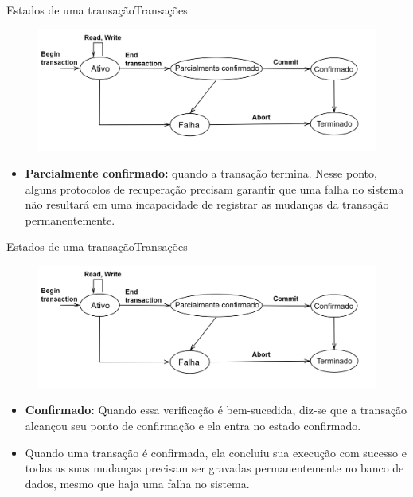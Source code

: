 \documentclass[t]{beamer}
\begin{document}
\begin{ftst}{Estados de uma transação}{Transações}
    \begin{figure}
        \centering
        \includegraphics[scale=0.15]{Figuras_transacoes/6.png}
    \end{figure}
    \small
    \begin{itemize}
        \item \textbf{Parcialmente confirmado:} quando a transação termina. Nesse ponto, alguns protocolos de recuperação precisam garantir que uma falha no sistema não resultará em uma incapacidade de registrar as mudanças da transação permanentemente.
    \end{itemize}
    
\end{ftst}


\begin{ftst}{Estados de uma transação}{Transações}
    \begin{figure}
        \centering
        \includegraphics[scale=0.12]{Figuras_transacoes/6.png}
    \end{figure}
    \small
    \begin{itemize}
        \item \textbf{Confirmado:} Quando essa verificação é bem-sucedida, diz-se que a transação alcançou seu ponto de confirmação e ela entra no estado confirmado. 
        \item Quando uma transação é confirmada, ela concluiu sua execução com sucesso e todas as suas mudanças precisam ser gravadas permanentemente no banco de dados, mesmo que haja uma falha no sistema.
    \end{itemize}
    
\end{ftst}
\end{document}

